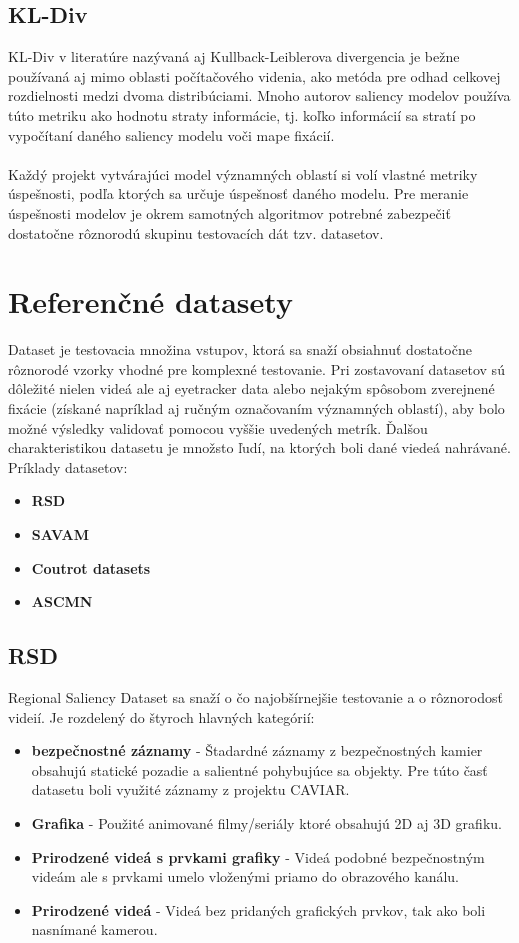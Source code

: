 \subsection{KL-Div}
KL-Div v literatúre nazývaná aj Kullback-Leiblerova divergencia\cite{kldiv} je bežne používaná aj mimo oblasti počítačového videnia, ako metóda pre odhad celkovej rozdielnosti medzi dvoma distribúciami.
Mnoho autorov saliency modelov používa túto metriku ako hodnotu straty informácie, tj. koľko informácií sa stratí po vypočítaní daného saliency modelu voči mape fixácií.
\\\\
Každý projekt vytvárajúci model významných oblastí si volí vlastné metriky úspešnosti, podľa ktorých sa určuje úspešnosť daného modelu.
Pre meranie úspešnosti modelov je okrem samotných algoritmov potrebné zabezpečiť dostatočne rôznorodú skupinu testovacích dát tzv. datasetov.

\section{Referenčné datasety}
Dataset je testovacia množina vstupov, ktorá sa snaží obsiahnuť dostatočne rôznorodé vzorky vhodné pre komplexné testovanie.
Pri zostavovaní datasetov sú dôležité nielen videá ale aj eyetracker data alebo nejakým spôsobom zverejnené fixácie (získané napríklad aj ručným označovaním významných oblastí), aby bolo možné výsledky validovať pomocou vyššie uvedených metrík.
Ďalšou charakteristikou datasetu je množsto ľudí, na ktorých boli dané viedeá nahrávané.
\\ Príklady datasetov:
\begin{itemize}
	\item \textbf{RSD}\cite{rsd}
	\item \textbf{SAVAM}\cite{savam}
	\item \textbf{Coutrot datasets}\cite{coutrot-database}
  \item \textbf{ASCMN}\cite{accv}
\end{itemize}

\subsection{RSD}
Regional Saliency Dataset sa snaží o čo najobšírnejšie testovanie a o rôznorodosť videií.
Je rozdelený do štyroch hlavných kategórií:
\begin{itemize}
	\item \textbf{bezpečnostné záznamy} - Štadardné záznamy z bezpečnostných kamier obsahujú statické pozadie a salientné pohybujúce sa objekty.
Pre túto časť datasetu boli využité záznamy z projektu CAVIAR\cite{rsd-caviar}.
	\item \textbf{Grafika} - Použité animované filmy/seriály ktoré obsahujú 2D aj 3D grafiku.
  \item \textbf{Prirodzené videá s prvkami grafiky} - Videá podobné bezpečnostným videám ale s prvkami umelo vloženými priamo do obrazového kanálu.
  \item \textbf{Prirodzené videá} - Videá bez pridaných grafických prvkov, tak ako boli nasnímané kamerou.
\end{itemize}

